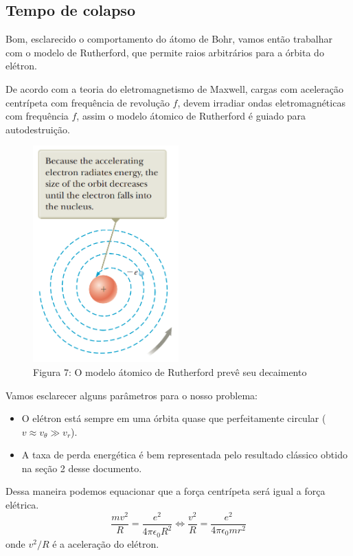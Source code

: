 \documentclass[12pt, letterpaper]{article}
\begin{document}
    \subsection{Tempo de colapso}

    Bom, esclarecido o comportamento do átomo de Bohr, vamos então trabalhar com o modelo de Rutherford, que permite raios arbitrários para a órbita do elétron.

    De acordo com a teoria do eletromagnetismo de Maxwell, cargas com aceleração centrípeta com frequência de revolução $f$, devem irradiar ondas eletromagnéticas com frequência $f$, assim o modelo átomico de Rutherford é guiado para autodestruição.

    \begin{figure}[H]
        \centering
        \includegraphics[width=0.5\textwidth]{ruth}
        \\{Figura 7: O modelo átomico de Rutherford prevê seu decaimento}
        \label{fig:ruth}
    \end{figure}

    Vamos esclarecer alguns parâmetros para o nosso problema:
    \begin{itemize}
        \item O elétron está sempre em uma órbita quase que perfeitamente circular ($v \approx v_\theta \gg v_r$).
        \item A taxa de perda energética é bem representada pelo resultado clássico obtido na seção 2 desse documento.
    \end{itemize}

    Dessa maneira podemos equacionar que a força centrípeta será igual a força elétrica.
    \begin{equation}
        \frac{mv^2}{R} = \frac{e^2}{4\pi\epsilon_0R^2} \Leftrightarrow \frac{v^2}{R} = \frac{e^2}{4\pi\epsilon_0mr^2}
    \end{equation}
    onde $v^2/R$ é a aceleração do elétron.
\end{document}

